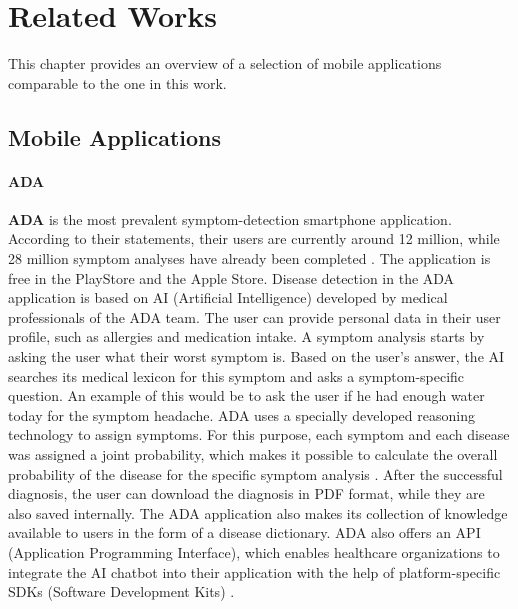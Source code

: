 \chapter{Related Works}
This chapter provides an overview of a selection of mobile applications comparable to the one in this work.

\section{Mobile Applications}
\subsubsection{ADA} 
\textbf{ADA} is the most prevalent symptom-detection smartphone application. According to their statements, their users are currently around 12 million, while 28 million symptom analyses have already been completed \cite{.adaHOME}. The application is free in the PlayStore and the Apple Store. Disease detection in the ADA application is based on AI (Artificial Intelligence) developed by medical professionals of the ADA team. The user can provide personal data in their user profile, such as allergies and medication intake. A symptom analysis starts by asking the user what their worst symptom is. Based on the user's answer, the AI searches its medical lexicon for this symptom and asks a symptom-specific question.
An example of this would be to ask the user if he had enough water today for the symptom headache. ADA uses a specially developed reasoning technology to assign symptoms. For this purpose, each symptom and each disease was assigned a joint probability, which makes it possible to calculate the overall probability of the disease for the specific symptom analysis \cite{.adaKI}. After the successful diagnosis, the user can download the diagnosis in PDF format, while they are also saved internally. The ADA application also makes its collection of knowledge available to users in the form of a disease dictionary. ADA also offers an API (Application Programming Interface), which enables healthcare organizations to integrate the AI chatbot into their application with the help of platform-specific SDKs (Software Development Kits)\cite{.adaFAQ} \cite{.adaDOCU}.

